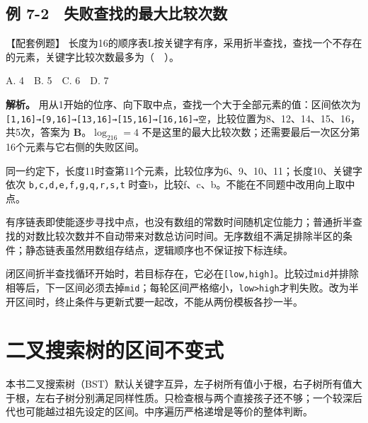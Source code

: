 \subsection{例 7-2　失败查找的最大比较次数}\label{DS07-ex2}

\begin{example}[配套案例]

【配套例题】 长度为16的顺序表L按关键字有序，采用折半查找，查找一个不存在的元素，关键字比较次数最多为（　）。

A. 4　B. 5　C. 6　D. 7

\end{example}

\textbf{解析。} 用从1开始的位序、向下取中点，查找一个大于全部元素的值：区间依次为 \texttt{[\allowbreak{}1,\allowbreak{}16]\allowbreak{}→[\allowbreak{}9,\allowbreak{}16]\allowbreak{}→[\allowbreak{}13,\allowbreak{}16]\allowbreak{}→[\allowbreak{}15,\allowbreak{}16]\allowbreak{}→[\allowbreak{}16,\allowbreak{}16]\allowbreak{}→空}，比较位置为8、12、14、15、16，共5次，答案为 \textbf{B}。\(\log_216=4\) 不是这里的最大比较次数；还需要最后一次区分第16个元素与它右侧的失败区间。

同一约定下，长度11时查第11个元素，比较位序为6、9、10、11；长度10、关键字依次 \texttt{b,\allowbreak{}c,\allowbreak{}d,\allowbreak{}e,\allowbreak{}f,\allowbreak{}g,\allowbreak{}q,\allowbreak{}r,\allowbreak{}s,\allowbreak{}t} 时查b，比较f、c、b。不能在不同题中改用向上取中点。

有序链表即使能逐步寻找中点，也没有数组的常数时间随机定位能力；普通折半查找的对数比较次数并不自动带来对数总访问时间。无序数组不满足排除半区的条件；静态链表虽然用数组存结点，逻辑顺序也不保证按下标连续。

\begin{methodbox}[先写查找区间不变式再写边界]

闭区间折半查找循环开始时，若目标存在，它必在\texttt{[\allowbreak{}low,\allowbreak{}high]\allowbreak{}}。比较过\texttt{mid}并排除相等后，下一区间必须去掉\texttt{mid}；每轮区间严格缩小，\texttt{low>\allowbreak{}high}才判失败。改为半开区间时，终止条件与更新式要一起改，不能从两份模板各抄一半。

\end{methodbox}

\section{二叉搜索树的区间不变式}\label{DS07-04}

本书二叉搜索树（BST）默认关键字互异，左子树所有值小于根，右子树所有值大于根，左右子树分别满足同样性质。只检查根与两个直接孩子还不够；一个较深后代也可能越过祖先设定的区间。中序遍历严格递增是等价的整体判断。

